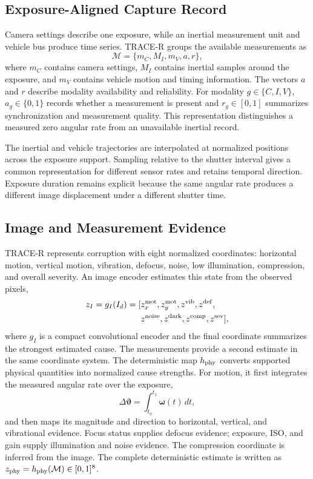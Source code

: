 \documentclass[journal]{IEEEtran}
\begin{document}
\subsection{Exposure-Aligned Capture Record}
Camera settings describe one exposure, while an inertial measurement unit and vehicle bus produce time series. TRACE-R groups the available measurements as
\begin{equation}
\mathcal{M}=\{m_C,M_I,m_V,a,r\},
\label{eq:packetgroups}
\end{equation}
where $m_C$ contains camera settings, $M_I$ contains inertial samples around the exposure, and $m_V$ contains vehicle motion and timing information. The vectors $a$ and $r$ describe modality availability and reliability. For modality $g\in\{C,I,V\}$, $a_g\in\{0,1\}$ records whether a measurement is present and $r_g\in[0,1]$ summarizes synchronization and measurement quality. This representation distinguishes a measured zero angular rate from an unavailable inertial record.

The inertial and vehicle trajectories are interpolated at normalized positions across the exposure support. Sampling relative to the shutter interval gives a common representation for different sensor rates and retains temporal direction. Exposure duration remains explicit because the same angular rate produces a different image displacement under a different shutter time.

\subsection{Image and Measurement Evidence}
TRACE-R represents corruption with eight normalized coordinates: horizontal motion, vertical motion, vibration, defocus, noise, low illumination, compression, and overall severity. An image encoder estimates this state from the observed pixels,
\begin{equation}
\begin{split}
z_I=g_I(I_d)=[&z_x^{\rm mot},z_y^{\rm mot},z^{\rm vib},z^{\rm def},\\
&z^{\rm noise},z^{\rm dark},z^{\rm comp},z^{\rm sev}],
\end{split}
\label{eq:imagecode}
\end{equation}
where $g_I$ is a compact convolutional encoder and the final coordinate summarizes the strongest estimated cause. The measurements provide a second estimate in the same coordinate system. The deterministic map $h_{\rm phy}$ converts supported physical quantities into normalized cause strengths. For motion, it first integrates the measured angular rate over the exposure,
\begin{equation}
\Delta\boldsymbol{\vartheta}=\int_{t_0}^{t_1}\boldsymbol{\omega}(t)\,dt,
\label{eq:motion}
\end{equation}
and then maps its magnitude and direction to horizontal, vertical, and vibrational evidence. Focus status supplies defocus evidence; exposure, ISO, and gain supply illumination and noise evidence. The compression coordinate is inferred from the image. The complete deterministic estimate is written as $z_{\rm phy}=h_{\rm phy}(\mathcal{M})\in[0,1]^8$.
\end{document}
